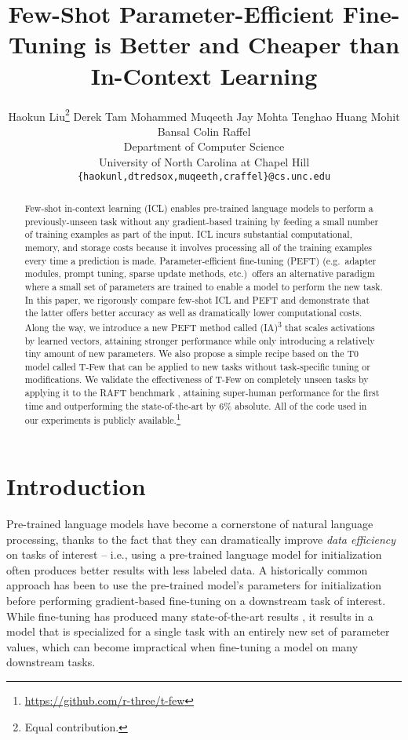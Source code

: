 \documentclass{article}
\title{Few-Shot Parameter-Efficient Fine-Tuning is Better and Cheaper than In-Context Learning}
\author{Haokun Liu\thanks{Equal contribution.} \quad Derek Tam \quad Mohammed Muqeeth 
  \And Jay Mohta \quad Tenghao Huang \quad Mohit Bansal \quad Colin Raffel \vspace{0.5em} \\ 
  Department of Computer Science\\
  University of North Carolina at Chapel Hill\\
  \texttt{\{haokunl,dtredsox,muqeeth,craffel\}@cs.unc.edu} \\
}
\newcommand{\ia}{{\fontfamily{lmtt}\selectfont (IA)\textsuperscript{3}}\xspace}
\newcommand{\tfew}{{\fontfamily{lmtt}\selectfont T-Few}\xspace}
\begin{document}
\maketitle


\begin{abstract}
Few-shot in-context learning (ICL) enables pre-trained language models to perform a previously-unseen task without any gradient-based training by feeding a small number of training examples as part of the input.
ICL incurs substantial computational, memory, and storage costs because it involves processing all of the training examples every time a prediction is made.
Parameter-efficient fine-tuning (PEFT) (e.g.\ adapter modules, prompt tuning, sparse update methods, etc.)\ offers an alternative paradigm where a small set of parameters are trained to enable a model to perform the new task.
In this paper, we rigorously compare few-shot ICL and PEFT and demonstrate that the latter offers better accuracy as well as dramatically lower computational costs.
Along the way, we introduce a new PEFT method called \ia that scales activations by learned vectors, attaining stronger performance while only introducing a relatively tiny amount of new parameters.
We also propose a simple recipe based on the T0 model \cite{sanh2021multitask} called \tfew that can be applied to new tasks without task-specific tuning or modifications.
We validate the effectiveness of \tfew on completely unseen tasks by applying it to the RAFT benchmark \cite{alex2021raft}, attaining super-human performance for the first time and outperforming the state-of-the-art by 6\% absolute.
All of the code used in our experiments is publicly available.\footnote[1]{\label{note:code} \url{https://github.com/r-three/t-few}}
\end{abstract}

\section{Introduction}

Pre-trained language models have become a cornerstone of natural language processing, thanks to the fact that they can dramatically improve \textit{data efficiency} on tasks of interest -- i.e., using a pre-trained language model for initialization often produces better results with less labeled data.
A historically common approach has been to use the pre-trained model's parameters for initialization before performing gradient-based fine-tuning on a downstream task of interest.
While fine-tuning has produced many state-of-the-art results \cite{sanh2021multitask}, it results in a model that is specialized for a single task with an entirely new set of parameter values, which can become impractical when fine-tuning a model on many downstream tasks.
\end{document}
